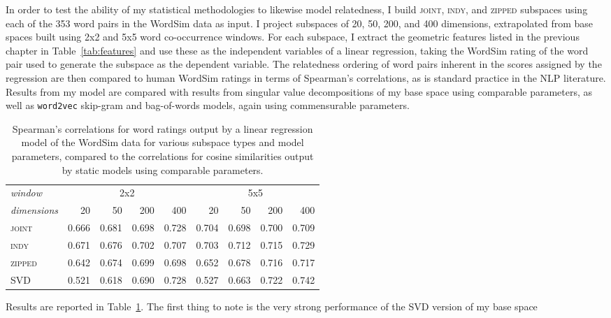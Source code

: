 In order to test the ability of my statistical methodologies to likewise model relatedness, I build \textsc{joint}, \textsc{indy}, and \textsc{zipped} subspaces using each of the 353 word pairs in the WordSim data as input.  I project subspaces of 20, 50, 200, and 400 dimensions, extrapolated from base spaces built using 2x2 and 5x5 word co-occurrence windows.  For each subspace, I extract the geometric features listed in the previous chapter in Table~\ref{tab:features} and use these as the independent variables of a linear regression, taking the WordSim rating of the word pair used to generate the subspace as the dependent variable.  The relatedness ordering of word pairs inherent in the scores assigned by the regression are then compared to human WordSim ratings in terms of Spearman's correlations, as is standard practice in the NLP literature.  Results from my model are compared with results from singular value decompositions of my base space using comparable parameters, as well as \texttt{word2vec} skip-gram and bag-of-words models, again using commensurable parameters.

\begin{table}
\centering
\begin{tabular}{lrrrrrrrr}
\hline
\emph{window} & \multicolumn{4}{c}{2x2} & \multicolumn{4}{c}{5x5} \\
\emph{dimensions} & 20 & 50 & 200 & 400 & 20 & 50 & 200 & 400 \\
\hline
\textsc{joint} & 0.666 & 0.681 & 0.698 & 0.728 & 0.704 & 0.698 & 0.700 & 0.709 \\
\textsc{indy} & 0.671 & 0.676 & 0.702 & 0.707 & 0.703 & 0.712 & 0.715 & 0.729 \\
\textsc{zipped} & 0.642 & 0.674 & 0.699 & 0.698 & 0.652 & 0.678 & 0.716 & 0.717 \\
\textsc{SVD} & 0.521 & 0.618 & 0.690 & 0.728 & 0.527 & 0.663 & 0.722 & 0.742 \\
\hline
\end{tabular}
\caption{Spearman's correlations for word ratings output by a linear regression model of the WordSim data for various subspace types and model parameters, compared to the correlations for cosine similarities output by static models using comparable parameters.}
\label{tab:related}
\end{table}

Results are reported in Table~\ref{tab:related}.  The first thing to note is the very strong performance of the SVD version of my base space

